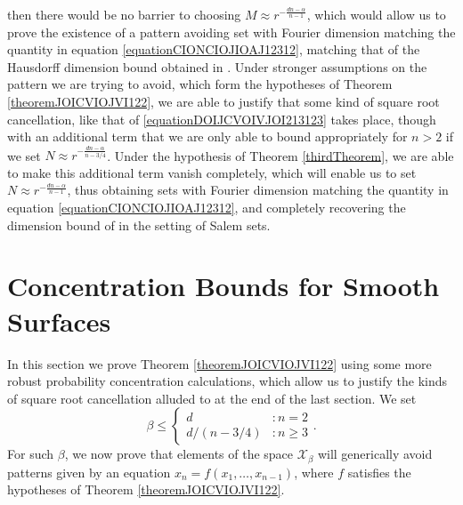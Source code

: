 \documentclass[dvipsnames,letterpaper,12pt]{article}
\numberwithin{equation}{section}
\numberwithin{theorem}{section}
\begin{document}
then there would be no barrier to choosing $M \approx r^{-\frac{dn-\alpha}{n-1}}$, which would allow us to prove the existence of a pattern avoiding set with Fourier dimension matching the quantity in equation \eqref{equationCIONCIOJIOAJ12312}, matching that of the Hausdorff dimension bound obtained in \cite{OurPaper}. Under stronger assumptions on the pattern we are trying to avoid, which form the hypotheses of Theorem \ref{theoremJOICVIOJVI122}, we are able to justify that some kind of square root cancellation, like that of \eqref{equationDOIJCVOIVJOI213123} takes place, though with an additional term that we are only able to bound appropriately for $n > 2$ if we set $N \approx r^{-\frac{dn-\alpha}{n-3/4}}$. Under the hypothesis of Theorem \ref{thirdTheorem}, we are able to make this additional term vanish completely, which will enable us to set $N \approx r^{-\frac{dn - \alpha}{n - 1}}$, thus obtaining sets with Fourier dimension matching the quantity in equation \eqref{equationCIONCIOJIOAJ12312}, and completely recovering the dimension bound of \cite{OurPaper} in the setting of Salem sets.

\section{Concentration Bounds for Smooth Surfaces}

In this section we prove Theorem \ref{theoremJOICVIOJVI122} using some more robust probability concentration calculations, which allow us to justify the kinds of square root cancellation alluded to at the end of the last section. We set
%
\[ \beta \leq \begin{cases} d &: n = 2 \\ d/(n - 3/4) &: n \geq 3 \end{cases}. \]
%
For such $\beta$, we now prove that elements of the space $\mathcal{X}_\beta$ will generically avoid patterns given by an equation $x_n = f(x_1,\dots,x_{n-1})$, where $f$ satisfies the hypotheses of Theorem \ref{theoremJOICVIOJVI122}.
\end{document}
